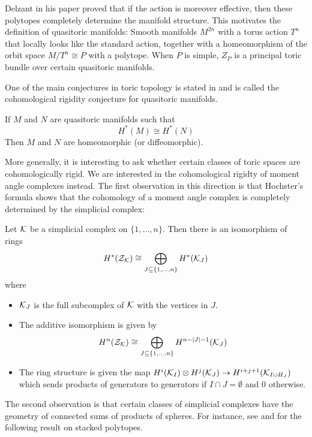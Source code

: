 \documentclass[a4paper]{article}
\begin{document}
Delzant in his paper \cite{Delzant} proved that if the action is moreover effective, then these polytopes completely determine the manifold structure. This motivates the definition of quasitoric manifolds: Smooth manifolds $M^{2n}$ with a torus action $T^n$ that locally looks like the standard action, together with a homeomorphism of the orbit space $M/T^n\cong P$ with a polytope. When $P$ is simple, $Z_P$ is a principal toric bundle over certain quasitoric manifolds. 

One of the main conjectures in toric topology is stated in \cite{Masuda} and is called the cohomological rigidity conjecture for quasitoric manifolds. 

\begin{conj}
If $M$ and $N$ are quasitoric manifolds such that $$H^\ast(M)\cong H^\ast(N)$$ Then $M$ and $N$ are homeomorphic (or diffeomorphic). 
\end{conj}

More generally, it is interesting to ask whether certain classes of toric spaces are cohomologically rigid. We are interested in the cohomological rigidty of moment angle complexes instead. The first observation in this direction is that Hochster's formula \cite{ToricTopology} shows that the cohomology of a moment angle complex is completely determined by the simplicial complex: 

\begin{thm}
Let $\mathcal{K}$ be a simplicial complex on $\{1,\dots,n\}$. Then there is an isomorphism of rings $$H^\ast(\mathcal{Z}_{\mathcal{K}})\cong\bigoplus_{J\subseteq\{1,\dots,n\}}H^\ast(\mathcal{K}_J)$$ where 
\begin{itemize}
\item $\mathcal{K}_J$ is the full subcomplex of $\mathcal{K}$ with the vertices in $J$. 
\item The additive isomorphism is given by $$H^n(\mathcal{Z}_{\mathcal{K}})\cong\bigoplus_{J\subseteq\{1,\dots,n\}}H^{n-\abs{J}-1}(\mathcal{K}_J)$$
\item The ring structure is given the map $H^i(\mathcal{K}_I)\otimes H^j(\mathcal{K}_J)\to H^{i+j+1}(\mathcal{K}_{I\cup H_J})$ which sends products of generators to generators if $I\cap J=\emptyset$ and $0$ otherwise. 
\end{itemize}
\end{thm}

The second observation is that certain classes of simplicial complexes have the geometry of connected sums of products of spheres. For instance, see \cite{Mcgraven} and \cite{Bosio} for the following result on stacked polytopes. 
\end{document}
